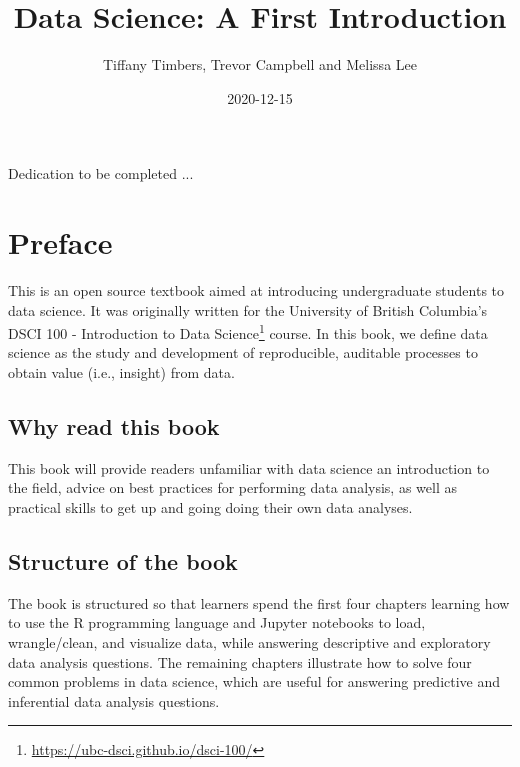 \documentclass[
]{krantz}
\title{Data Science: A First Introduction}
\author{Tiffany Timbers, Trevor Campbell and Melissa Lee}
\date{2020-12-15}
\renewcommand{\href}[2]{#2\footnote{\url{#1}}}
\begin{document}
\maketitle


\thispagestyle{empty}

\begin{center}
Dedication to be completed ...
\end{center}

\setlength{\abovedisplayskip}{-5pt}
\setlength{\abovedisplayshortskip}{-5pt}

{
\hypersetup{linkcolor=}
\setcounter{tocdepth}{2}
\tableofcontents
}
\listoftables
\listoffigures
\hypertarget{preface}{%
\chapter*{Preface}\label{preface}}


This is an open source textbook aimed at introducing undergraduate students to data science. It was originally written for the University of British Columbia's \href{https://ubc-dsci.github.io/dsci-100/}{DSCI 100 - Introduction to Data Science} course. In this book, we define data science as the study and development of reproducible, auditable processes to obtain value (i.e., insight) from data.

\hypertarget{why-read-this-book}{%
\section*{Why read this book}\label{why-read-this-book}}


This book will provide readers unfamiliar with data science an introduction to
the field, advice on best practices for performing data analysis, as well as
practical skills to get up and going doing their own data analyses.

\hypertarget{structure-of-the-book}{%
\section*{Structure of the book}\label{structure-of-the-book}}


The book is structured so that learners spend the first four chapters learning how to use the R programming language and Jupyter notebooks to load, wrangle/clean, and visualize data, while answering descriptive and exploratory data analysis questions. The remaining chapters illustrate how to solve four common problems in data science, which are useful for answering predictive and inferential data analysis questions.
\end{document}
